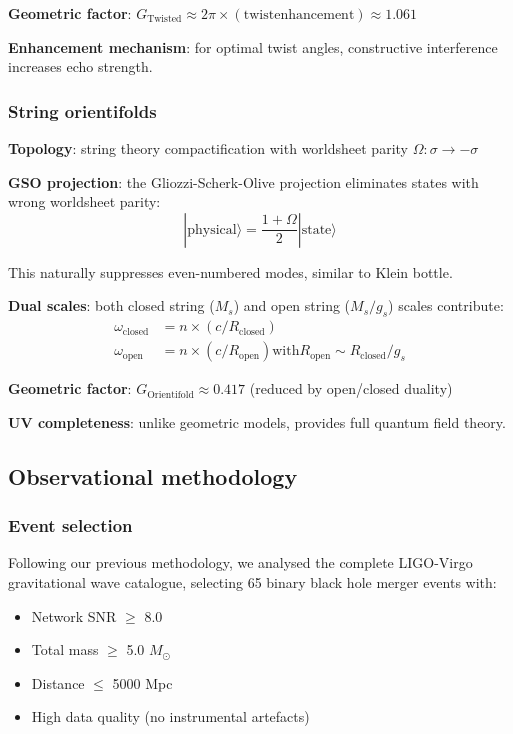 \documentclass[12pt]{article}
\newcommand{\Msun}{M_{\odot}}
\begin{document}
\textbf{Geometric factor}: $G_{\mathrm{Twisted}} \approx 2\pi \times \mathrm{(twist enhancement)} \approx 1.061$

\textbf{Enhancement mechanism}: for optimal twist angles, constructive interference increases echo strength.

\subsubsection{String orientifolds}

\textbf{Topology}: string theory compactification with worldsheet parity $\Omega: \sigma \to -\sigma$

\textbf{GSO projection}: the Gliozzi-Scherk-Olive projection eliminates states with wrong worldsheet parity:
\begin{equation}
|\mathrm{physical}\rangle = \frac{1 + \Omega}{2} |\mathrm{state}\rangle
\end{equation}

This naturally suppresses even-numbered modes, similar to Klein bottle.

\textbf{Dual scales}: both closed string ($M_s$) and open string ($M_s/g_s$) scales contribute:
\begin{eqnarray}
\omega_{\mathrm{closed}} &= n \times (c/R_{\mathrm{closed}}) \\
\omega_{\mathrm{open}} &= n \times (c/R_{\mathrm{open}}) \mathrm{ with } R_{\mathrm{open}} \sim R_{\mathrm{closed}}/g_s
\end{eqnarray}

\textbf{Geometric factor}: $G_{\mathrm{Orientifold}} \approx 0.417$ (reduced by open/closed duality)

\textbf{UV completeness}: unlike geometric models, provides full quantum field theory.

\subsection{Observational methodology}

\subsubsection{Event selection}

Following our previous methodology, we analysed the complete LIGO-Virgo gravitational wave catalogue, selecting 65 binary black hole merger events with:

\begin{itemize}
\item Network SNR $\geq$ 8.0
\item Total mass $\geq$ 5.0 $\Msun$
\item Distance $\leq$ 5000 Mpc
\item High data quality (no instrumental artefacts)
\end{itemize}
\end{document}
